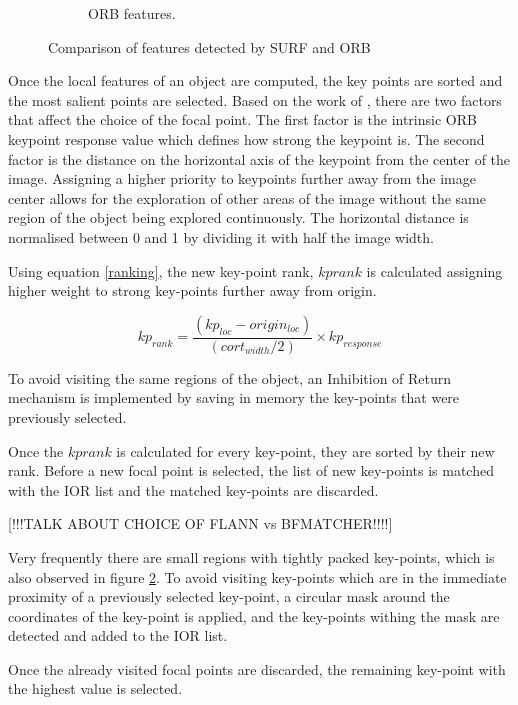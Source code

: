 \documentclass{l4proj}
\begin{document}
\begin{figure}[ht]
\begin{subfigure}[b]{0.49\textwidth}
    \caption{ORB features. }
    \label{orbfeatures}
  \end{subfigure}
  \caption{Comparison of features detected by SURF and ORB}
  \label{features}

\end{figure}

Once the local features of an object are computed, the key points are sorted and the most salient points are selected. Based on the work of \citet{RyanWong}, there are two factors that affect the choice of the focal point. The first factor is the intrinsic ORB keypoint response value which defines how strong the keypoint is. The second factor is the distance on the horizontal axis of the keypoint from the center of the image. Assigning a higher priority to keypoints further away from the image center allows for the exploration of other areas of the image without the same region of the object being explored continuously. The horizontal distance is normalised between 0 and 1 by dividing it with half the image width. 


Using equation \ref{ranking}, the new key-point rank, $kp{rank}$ is calculated assigning higher weight to strong key-points further away from origin.


\begin{equation}\label{ranking}
 kp_{rank} = \frac{(kp_{loc} - origin_{loc})}{(cort_{width}/2)} \times kp_{response}
\end{equation}

 
To avoid visiting the same regions of the object, an Inhibition of Return mechanism is implemented by saving in memory the key-points that were previously selected. 

Once the $kp{rank}$ is calculated for every key-point, they are sorted by their new rank. Before a new focal point is selected, the list of new key-points is matched with the IOR list and the matched key-points are discarded. 

[!!!TALK ABOUT CHOICE OF FLANN vs BFMATCHER!!!!]

Very frequently there are small regions with tightly packed key-points, which is also observed in figure \ref{features}. To avoid visiting key-points which are in the immediate proximity of a previously selected key-point, a circular mask around the coordinates of the key-point is applied, and the key-points withing the mask are detected and added to the IOR list. 

Once the already visited focal points are discarded, the remaining key-point with the highest value is selected. 
\end{document}
